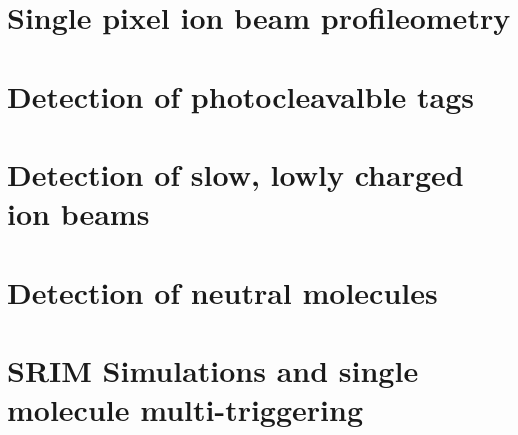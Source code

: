 \chapter{Single pixel ion beam profileometry}

\chapter{Detection of photocleavalble tags}

\chapter{Detection of slow, lowly charged ion beams}

\chapter{Detection of neutral molecules}

\chapter{SRIM Simulations and single molecule multi-triggering}